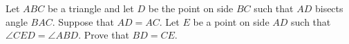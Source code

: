 Let $ABC$ be a triangle and let $D$ be the point on side $BC$ such that $AD$ bisects angle $BAC$. Suppose that $AD=AC$. Let $E$ be a point on side $AD$ such that $\angle CED=\angle ABD$. Prove that $BD=CE$.

